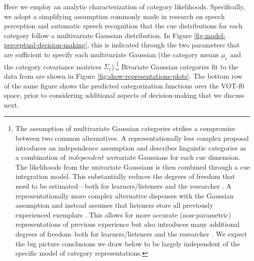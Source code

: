 \documentclass[
  11pt,
  man,floatsintext]{apa6}
\begin{document}
Here we employ an analytic characterization of category likelihoods. Specifically, we adopt a simplifying assumption commonly made in research on speech perception \autocite{clayards2008,feldman2009,kleinschmidt-jaeger2015,norris-mcqueen2008} and automatic speech recognition \autocite{jurafsky-martin2000} that the cue distributions for each category follow a multivariate Gaussian distribution. In Figure \ref{fig:model-perceptual-decision-making}, this is indicated through the two parameters that are sufficient to specify each multivariate Gaussian (the category means \(\mu_c\) and the category covariance matrices \(\Sigma_c\)).\footnote{\label{fn:alternative-representational-changes} The assumption of multivariate Gaussian categories strikes a compromise between two common alternatives. A representationally less complex proposal introduces an independence assumption and describes linguistic categories as a combination of \emph{independent uni}variate Gaussians for each cue dimension. The likelihoods from the univariate Gaussians is then combined through a cue integration model. This substantially reduces the degrees of freedom that need to be estimated---both for learners/listeners and the researcher \autocite[see][]{toscano-mcmurray2010}. A representationally more complex alternative dispenses with the Gaussian assumption and instead assumes that listeners store all previously experienced exemplars \autocite[or some pruned set of exemplars,][]{pierrehumbert2001}. This allows for more accurate (non-parametric) representations of previous experience but also introduces many additional degrees of freedom--both for learners/listeners and the researcher \autocite[for discussion, see][]{apfelbaum-mcmurray2015}. We expect the big picture conclusions we draw below to be largely independent of the specific model of category representations.} Bivariate Gaussian categories fit to the data from \textcite{chodroff-wilson2018} are shown in Figure \ref{fig:show-representations-plots}. The bottom row of the same figure shows the predicted categorization functions over the VOT-f0 space, prior to considering additional aspects of decision-making that we discuss next.
\end{document}
